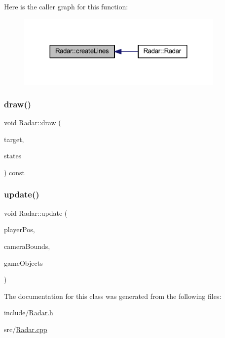 Here is the caller graph for this function\+:
\nopagebreak
\begin{figure}[H]
\begin{center}
\leavevmode
\includegraphics[width=288pt]{class_radar_a1503fd82214f512677a7304abf288344_icgraph}
\end{center}
\end{figure}
\mbox{\label{class_radar_a89658480ff0e15b096097f8b7965893b}} 
\subsubsection{\texorpdfstring{draw()}{draw()}}
{\footnotesize\ttfamily void Radar\+::draw (\begin{DoxyParamCaption}\item[{sf\+::\+Render\+Target \&}]{target,  }\item[{sf\+::\+Render\+States}]{states }\end{DoxyParamCaption}) const\hspace{0.3cm}{\ttfamily [override]}}

\mbox{\label{class_radar_adc8e7611cbff8077fe6d9a871da49bea}} 
\subsubsection{\texorpdfstring{update()}{update()}}
{\footnotesize\ttfamily void Radar\+::update (\begin{DoxyParamCaption}\item[{const sf\+::\+Vector2f \&}]{player\+Pos,  }\item[{const sf\+::\+Float\+Rect \&}]{camera\+Bounds,  }\item[{const std\+::vector$<$ std\+::pair$<$ \hyperlink{class_game_object_a4bf9e8f660e6a49f1b802c2aa9dd95af}{Game\+Object\+::\+Type}, sf\+::\+Vector2f $>$$>$ \&}]{game\+Objects }\end{DoxyParamCaption})}



The documentation for this class was generated from the following files\+:\begin{DoxyCompactItemize}
\item 
include/\hyperlink{_radar_8h}{Radar.\+h}\item 
src/\hyperlink{_radar_8cpp}{Radar.\+cpp}\end{DoxyCompactItemize}
